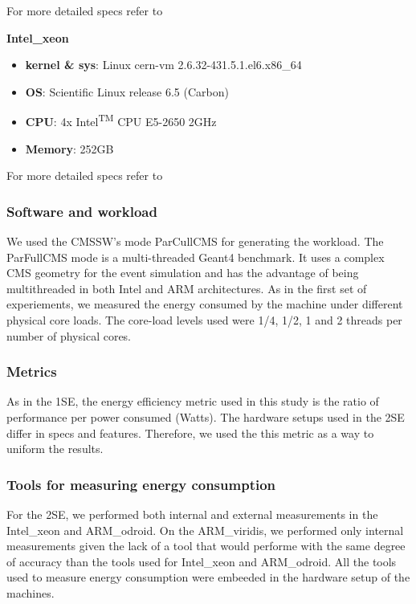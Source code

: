 For more detailed specs refer to \cite{odroid_specs}


\vspace{10mm}
\textbf{Intel\_xeon}
\begin{itemize}
  \item[] \textbf{kernel \& sys}:  Linux cern-vm 2.6.32-431.5.1.el6.x86\_64
  \item[] \textbf{OS}: Scientific Linux release 6.5 (Carbon)
  \item[] \textbf{CPU}:    4x Intel\textsuperscript{TM} CPU E5-2650 \@2GHz
  \item[] \textbf{Memory}:        252GB
\end{itemize}

For more detailed specs refer to \cite{xeon_specs}


\subsubsection*{Software and workload}
We used the CMSSW's mode ParCullCMS for generating the workload. The ParFullCMS mode is a multi-threaded Geant4 \cite{GEANT4} benchmark. It uses a complex CMS geometry for the event simulation and has the advantage of being multithreaded in both Intel and ARM architectures. As in the first set of experiements, we measured the energy consumed by the machine under different physical core loads. The core-load levels used were 1/4, 1/2, 1 and 2 threads per number of physical cores. 

\subsubsection*{Metrics}
As in the 1SE, the energy efficiency metric used in this study is the ratio of performance per power consumed (Watts). The hardware setups used in the 2SE differ in specs and features. Therefore, we used the this metric as a way to uniform the results.

\subsubsection*{Tools for measuring energy consumption}
For the 2SE, we performed both internal and external measurements in the Intel\_xeon and ARM\_odroid. On the ARM\_viridis, we performed only internal measurements given the lack of a tool that would performe with the same degree of accuracy than the tools used for Intel\_xeon and ARM\_odroid. All the tools used to measure energy consumption were embeeded in the hardware setup of the machines.

